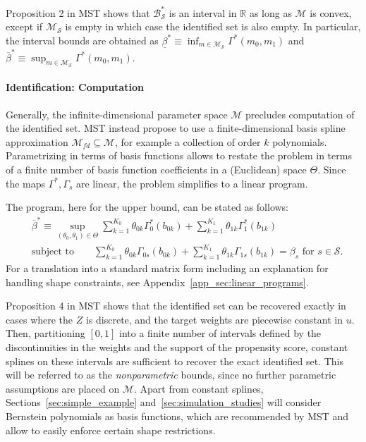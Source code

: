\documentclass[12pt,a4paper,english]{article} %
\numberwithin{equation}{section}
\theoremstyle{definition}
\theoremstyle{remark}
\theoremstyle{plain}
\begin{document}
Proposition 2 in MST shows that $\mathcal{B}_\mathcal{S}^*$ is an interval in $\mathbb{R}$ as long as $\mathcal{M}$ is convex, except if $\mathcal{M}_\mathcal{S}$ is empty in which case the identified set is also empty.
In particular, the interval bounds are obtained as $\underline{\beta}^* \equiv \inf_{m\in\mathcal{M}_\mathcal{S}}\Gamma^*(m_0, m_1)$ and $\overline{\beta}^* \equiv \sup_{m\in\mathcal{M}_\mathcal{S}}\Gamma^*(m_0, m_1)$.


\paragraph{Identification: Computation}
Generally, the infinite-dimensional parameter space $\mathcal{M}$ precludes computation of the identified set.
MST instead propose to use a finite-dimensional basis spline approximation $\mathcal{M}_{fd}\subseteq{\mathcal{M}}$, for example a collection of order $k$ polynomials.
Parametrizing in terms of basis functions allows to restate the problem in terms of a finite number of basis function coefficients in a (Euclidean) space $\Theta$.
Since the maps $\Gamma^*, \Gamma_s$ are linear, the problem simplifies to a linear program.

The program, here for the upper bound, can be stated as follows:
\begin{align}\label{eq:lp_identification}
  &\overline{\beta}^* \equiv \sup_{(\theta_0, \theta_1)\in\Theta} \sum_{k=1}^{K_0}\theta_{0k}\Gamma^*_0(b_{0k}) + \sum_{k=1}^{K_1}\theta_{1k}\Gamma^*_1(b_{1k}) \\
  &\text{subject to} \qquad \sum_{k=1}^{K_0}\theta_{0k}\Gamma_{0s}(b_{0k}) + \sum_{k=1}^{K_1}\theta_{1k}\Gamma_{1s}(b_{1k}) = \beta_s \text{ for } s \in \mathcal{S}.
\end{align}
For a translation into a standard matrix form including an explanation for handling shape constraints, see Appendix~\ref{app_sec:linear_programs}.

Proposition 4 in MST shows that the identified set can be recovered exactly in cases where the $Z$ is discrete, and the target weights are piecewise constant in $u$.
Then, partitioning $[0,1]$ into a finite number of intervals defined by the discontinuities in the weights and the support of the propensity score, constant splines on these intervals are sufficient to recover the exact identified set.
This will be referred to as the \textit{nonparametric} bounds, since no further parametric assumptions are placed on $\mathcal{M}$.
Apart from constant splines, Sections~\ref{sec:simple_example} and~\ref{sec:simulation_studies} will consider Bernstein polynomials as basis functions, which are recommended by MST and allow to easily enforce certain shape restrictions.
\end{document}
